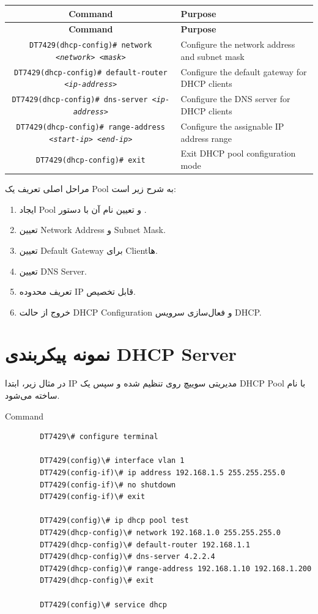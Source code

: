 \documentclass[11pt,letterpaper]{report}
\newenvironment{cmdtable}[1]{%
	\begin{LTR}
		\captionsetup{type=table}
		\captionof{table}{#1}
		\begin{longtable}{C P}
			\toprule
			\textbf{Command} & \textbf{Purpose} \\
			\midrule
			\endfirsthead
			\toprule
			\textbf{Command} & \textbf{Purpose} \\
			\midrule
			\endhead
			\bottomrule
			\endfoot
		}{%
		\end{longtable}
	\end{LTR}
}
\begin{document}
	\begin{cmdtable}{DHCP Pool Commands}
		\texttt{DT7429(dhcp-config)\# network \textit{\textless network\textgreater} \textit{\textless mask\textgreater}} &
		Configure the network address and subnet mask \\

		\texttt{DT7429(dhcp-config)\# default-router \textit{\textless ip-address\textgreater}} &
		Configure the default gateway for DHCP clients \\

		\texttt{DT7429(dhcp-config)\# dns-server \textit{\textless ip-address\textgreater}} &
		Configure the DNS server for DHCP clients \\

		\texttt{DT7429(dhcp-config)\# range-address \textit{\textless start-ip\textgreater} \textit{\textless end-ip\textgreater}} &
		Configure the assignable IP address range \\

		\texttt{DT7429(dhcp-config)\# exit} &
		Exit DHCP pool configuration mode
	\end{cmdtable}

	مراحل اصلی تعریف یک Pool به شرح زیر است:

	\begin{enumerate}
		\item ایجاد Pool و تعیین نام آن با دستور .
		\item تعیین Network Address و Subnet Mask.
		\item تعیین Default Gateway برای Clientها.
		\item تعیین DNS Server.
		\item تعریف محدوده IP قابل تخصیص.
		\item خروج از حالت DHCP Configuration و فعال‌سازی سرویس DHCP.
	\end{enumerate}


	\section{نمونه پیکربندی DHCP Server}

	در مثال زیر، ابتدا IP مدیریتی سوییچ روی  تنظیم شده و سپس
	یک DHCP Pool با نام  ساخته می‌شود.

	\begin{latin}
		\begin{cliexample}{Command}
			\begin{verbatim}
		DT7429\# configure terminal

		DT7429(config)\# interface vlan 1
		DT7429(config-if)\# ip address 192.168.1.5 255.255.255.0
		DT7429(config-if)\# no shutdown
		DT7429(config-if)\# exit

		DT7429(config)\# ip dhcp pool test
		DT7429(dhcp-config)\# network 192.168.1.0 255.255.255.0
		DT7429(dhcp-config)\# default-router 192.168.1.1
		DT7429(dhcp-config)\# dns-server 4.2.2.4
		DT7429(dhcp-config)\# range-address 192.168.1.10 192.168.1.200
		DT7429(dhcp-config)\# exit

		DT7429(config)\# service dhcp
			\end{verbatim}
		\end{cliexample}
	\end{latin}
\end{document}
